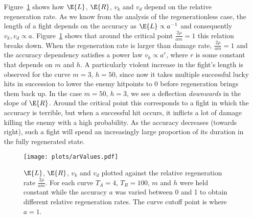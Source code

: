 Figure~\ref{fig:arValues} shows how $\E{L}$, $\E{R}$, $v_k$ and $v_d$ depend on the relative regeneration rate. As we know from the analysis of the regenerationless case, the length of a fight depends on the accuracy as $\E{L} \propto a^{-1}$ and consequently $v_k,v_d \propto a$. Figure~\ref{fig:arValues} shows that around the critical point $\frac{2\rho}{am} = 1$ this relation breaks down. When the regeneration rate is larger than damage rate, $\frac{2\rho}{am} = 1$ and the accuracy dependency satisfies a power law $v_k \propto a^r$, where $r$ is some constant that depends on $m$ and $h$. A particularly violent increase in the fight's length is observed for the curve $m=3$, $h=50$, since now it takes multiple successful lucky hits in succession to lower the enemy hitpoints to 0 before regeneration brings them back up.
In the case $m=50$, $h=3$, we see a deflection \emph{downwards} in the slope of $\E{R}$. Around the critical point this corresponds to a fight in which the accuracy is terrible, but when a successful hit occurs, it inflicts a lot of damage killing the enemy with a high probability. As the accuracy decreases (towards right), such a fight will spend an increasingly large proportion of its duration in the fully regenerated state.
\begin{figure}[h]
	\centering
    \texttt{[image: plots/arValues.pdf]}
	\caption{$\E{L}$, $\E{R}$, $v_k$ and $v_d$ plotted against the relative regeneration rate $\frac{2\rho}{am}$. For each curve $T_A=4$, $T_R=100$, $m$ and $h$ were held constant while the accuracy $a$ was varied between 0 and 1 to obtain different relative regeneration rates. The curve cutoff point is where $a=1$.}\label{fig:arValues}
\end{figure}
